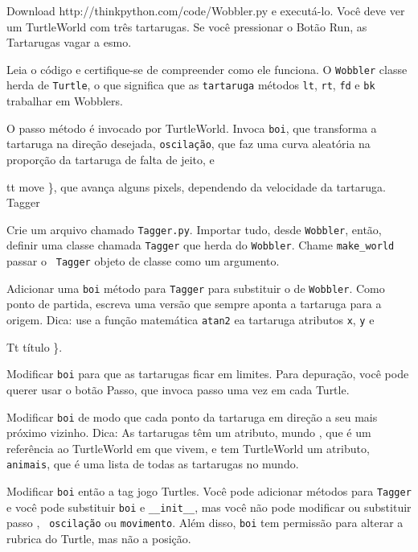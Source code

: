 \documentclass[10pt]{book}
\begin{document}
\begin{exercise}
\begin{v erbatim}
\begin{}
\begin{enumerate}

\item Download \url{} http://thinkpython.com/code/Wobbler.py e executá-lo. Você
deve ver um TurtleWorld com três tartarugas. Se você pressionar o
Botão {\sf Run}, as Tartarugas vagar a esmo.

\item Leia o código e certifique-se de compreender como ele funciona.
O {\tt Wobbler} classe herda de {\tt Turtle}, o que significa
que as {\tt tartaruga} métodos {\tt lt}, {\tt rt}, {\tt fd}
e {\tt bk} trabalhar em Wobblers.

O passo {\tt} método é invocado por TurtleWorld. Invoca
{\tt boi}, que transforma a tartaruga na direção desejada,
{\tt oscilação}, que faz uma curva aleatória na proporção da tartaruga de
falta de jeito, e {tt move \}, que avança alguns pixels,
dependendo da velocidade da tartaruga.
\index{} Tagger

\item Crie um arquivo chamado {\tt Tagger.py}. Importar tudo, desde
  {\tt Wobbler}, então, definir uma classe chamada {\tt Tagger} que herda
  do {\tt Wobbler}. Chame \verb "make_world" passar o {\tt
    Tagger} objeto de classe como um argumento.

\item Adicionar uma {\tt boi} método para {\tt Tagger} para substituir o de
  {\tt Wobbler}. Como ponto de partida, escreva uma versão que sempre
  aponta a tartaruga para a origem. Dica: use a função matemática
  {\tt atan2} ea tartaruga atributos {\tt x}, {\tt y} e
  {Tt título \}.

\item Modificar {\tt boi} para que as tartarugas ficar em limites.
  Para depuração, você pode querer usar o botão {\sf Passo},
  que invoca {passo \tt} uma vez em cada Turtle.

\item Modificar {\tt boi} de modo que cada ponto da tartaruga em direção a seu mais próximo
  vizinho. Dica: As tartarugas têm um atributo, {mundo \tt}, que é um
  referência ao TurtleWorld em que vivem, e tem TurtleWorld
  um atributo, {\tt animais}, que é uma lista de todas as tartarugas no
  mundo.

\item Modificar {\tt boi} então a tag jogo Turtles. Você pode adicionar métodos
  para {\tt Tagger} e você pode substituir {\tt boi} e
  \Verb "__init__", mas você não pode modificar ou substituir {passo \tt}, {\tt
    oscilação} ou {\tt movimento}. Além disso, {\tt boi} tem permissão para alterar a
  rubrica do Turtle, mas não a posição.

}}
\end{enumerate}
\end{}
\end{v erbatim}
\end{exercise}
\end{document}
